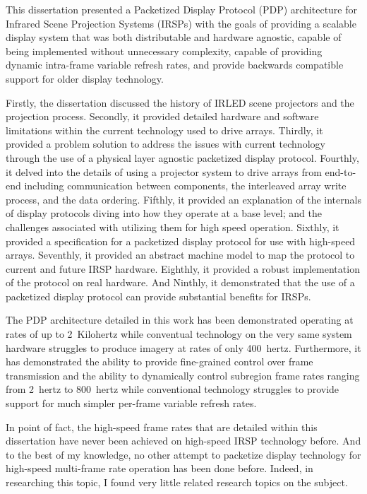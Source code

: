 \label{chap:conclusion}
This dissertation presented a Packetized Display Protocol (PDP) architecture for Infrared Scene Projection Systems (IRSPs) with the goals of providing a scalable display system that was both distributable and hardware agnostic, capable of being implemented without unnecessary complexity, capable of providing dynamic intra-frame variable refresh rates, and provide backwards compatible support for older display technology.

Firstly, the dissertation discussed the history of IRLED scene projectors and the projection process. Secondly, it provided detailed hardware and software limitations within the current technology used to drive arrays. Thirdly, it provided a problem solution to address the issues with current technology through the use of a  physical layer agnostic packetized display protocol. Fourthly, it delved into the details of using a projector system to drive arrays from end-to-end including communication between components, the interleaved array write process, and the data ordering. Fifthly, it provided an explanation of the internals of display protocols diving into how they operate at a base level; and the challenges associated with utilizing them for high speed operation. Sixthly, it provided a specification for a packetized display protocol for use with high-speed arrays. Seventhly, it provided an abstract machine model to map the protocol to current and future IRSP hardware. Eighthly, it provided a robust implementation of the protocol on real hardware. And Ninthly, it demonstrated that the use of a packetized display protocol can provide substantial benefits for IRSPs.

The PDP architecture detailed in this work has been demonstrated operating at rates of up to \mbox{2 Kilohertz} while conventual technology on the very same system hardware struggles to produce imagery at rates of only \mbox{400 hertz}. Furthermore, it has demonstrated the ability to provide fine-grained control over frame transmission and the ability to dynamically control subregion frame rates ranging from \mbox{2 hertz} to \mbox{800 hertz} while conventional technology struggles to provide support for much simpler per-frame variable refresh rates.

In point of fact, the high-speed frame rates that are detailed within this dissertation have never been achieved on high-speed IRSP technology before. And to the best of my knowledge, no other attempt to packetize display technology for high-speed multi-frame rate operation has been done before. Indeed, in researching this topic, I found very little related research topics on the subject.

